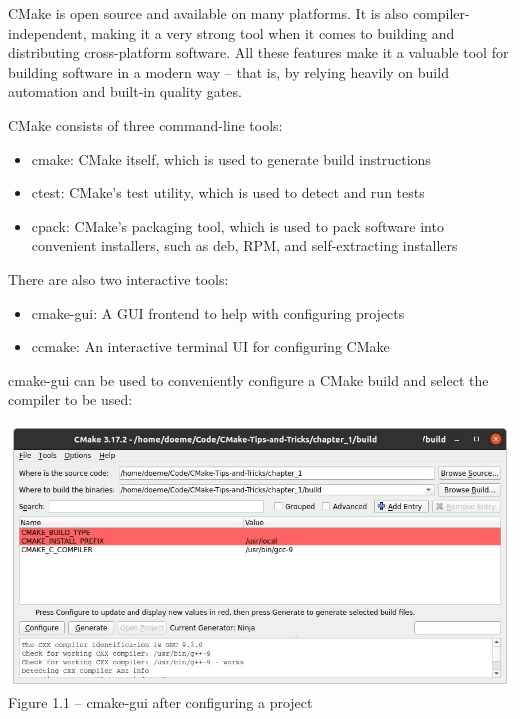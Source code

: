 CMake is open source and available on many platforms. It is also compiler-independent, making it a very strong tool when it comes to building and distributing cross-platform software. All these features make it a valuable tool for building software in a modern way – that is, by relying heavily on build automation and built-in quality gates.

CMake consists of three command-line tools:

\begin{itemize}
\item 
cmake: CMake itself, which is used to generate build instructions

\item 
ctest: CMake's test utility, which is used to detect and run tests

\item 
cpack: CMake's packaging tool, which is used to pack software into convenient installers, such as deb, RPM, and self-extracting installers
\end{itemize}

There are also two interactive tools:

\begin{itemize}
\item 
cmake-gui: A GUI frontend to help with configuring projects

\item 
ccmake: An interactive terminal UI for configuring CMake
\end{itemize}

cmake-gui can be used to conveniently configure a CMake build and select the compiler to be used:

\begin{center}
\includegraphics[width=1.\textwidth]{content/1/chapter1/images/1.jpg}\\
Figure 1.1 – cmake-gui after configuring a project
\end{center}

